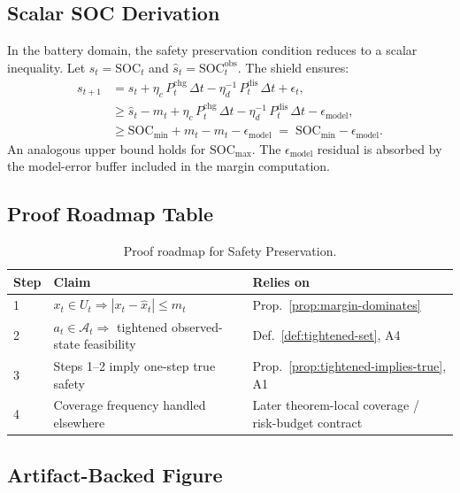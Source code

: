 \subsection{Scalar SOC Derivation}

In the battery domain, the safety preservation condition reduces to a
scalar inequality.  Let $s_t = \text{SOC}_t$ and
$\hat{s}_t = \text{SOC}_t^{\text{obs}}$.  The shield ensures:
\begin{align}
  s_{t+1} &= s_t + \eta_c\,P_t^{\text{chg}}\,\Delta t
    - \eta_d^{-1}\,P_t^{\text{dis}}\,\Delta t + \epsilon_t, \nonumber \\
  &\ge \hat{s}_t - m_t + \eta_c\,P_t^{\text{chg}}\,\Delta t
    - \eta_d^{-1}\,P_t^{\text{dis}}\,\Delta t - \epsilon_{\text{model}},
    \nonumber \\
  &\ge \text{SOC}_{\min} + m_t - m_t - \epsilon_{\text{model}}
    \;=\; \text{SOC}_{\min} - \epsilon_{\text{model}}.
    \label{eq:soc-lower}
\end{align}
An analogous upper bound holds for $\text{SOC}_{\max}$.  The
$\epsilon_{\text{model}}$ residual is absorbed by the model-error buffer
included in the margin computation.

\subsection{Proof Roadmap Table}

\begin{table}[ht]
\centering
\caption{Proof roadmap for Safety Preservation.}
\label{tab:safety-roadmap}
\begin{tabular}{lll}
\toprule
\textbf{Step} & \textbf{Claim} & \textbf{Relies on} \\
\midrule
1 & $x_t \in U_t \Rightarrow |x_t - \hat{x}_t| \le m_t$ & Prop.~\ref{prop:margin-dominates} \\
2 & $a_t \in \mathcal{A}_t \Rightarrow$ tightened observed-state feasibility & Def.~\ref{def:tightened-set}, A4 \\
3 & Steps 1--2 imply one-step true safety & Prop.~\ref{prop:tightened-implies-true}, A1 \\
4 & Coverage frequency handled elsewhere & Later theorem-local coverage / risk-budget contract \\
\bottomrule
\end{tabular}
\end{table}

\subsection{Artifact-Backed Figure}


